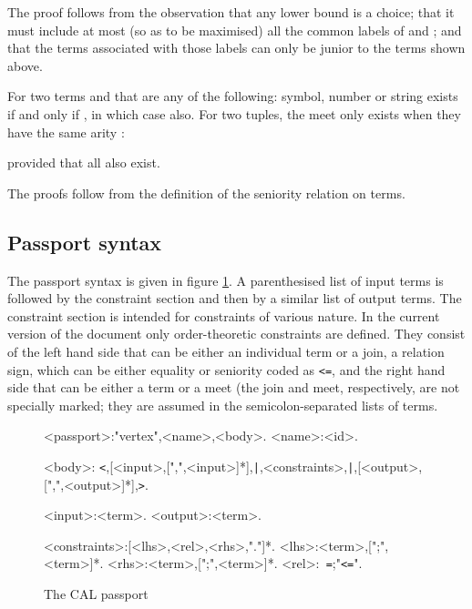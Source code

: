 \documentclass[11pt]{report}
\begin{document}
The proof follows from the observation that any lower bound is a choice; that it must include at most
(so as to be maximised) all the common labels of  and ; and that the terms associated with those labels can only be junior to the terms shown above.


\begin{prop}
For two terms  and  that are any of the following: symbol, number or string 
exists if and only if , in which case  also. For two tuples, the meet only 
exists when they have the same arity :

provided that all  also exist.
\end{prop}
The proofs follow from the definition of the seniority relation on terms.

\subsection{Passport syntax}

The passport syntax is given in figure \ref{pass-syntax}. A parenthesised list of input terms is followed by the constraint section and then by a similar list of output terms. The constraint section is intended for constraints of various nature. In the current version of the document only order-theoretic constraints are defined. They consist of the left hand side that can be either an individual term or a join, a relation sign, which can be either equality  or seniority  coded as \verb"<=", and the right hand side that can be either a term or a meet (the join and meet, respectively, are not specially marked; they are assumed in the semicolon-separated lists of terms.

\begin{figure}
\begin{framed}
\begin{grammar}
[(colon){}]
[(semicolon)]
[(comma){}]
[(period){\\}]
[(quote){\begin{bf}}{\end{bf}}]
[(nonterminal){}{}]
<passport>:"vertex",<name>,<body>.
<name>:<id>.

<body>: \verb"<",[<input>,[",",<input>]*],\verb"|",<constraints>,\verb"|",[<output>,[",",<output>]*],\verb">".

<input>:<term>.
<output>:<term>.

<constraints>:[<lhs>,<rel>,<rhs>,"."]*.
<lhs>:<term>,[";",<term>]*.
<rhs>:<term>,[";",<term>]*.
<rel>:\verb" =";"{\tt <=}".

\end{grammar}
\end{framed}
\caption{The CAL passport\label{pass-syntax}}
\end{figure}
\end{document}
